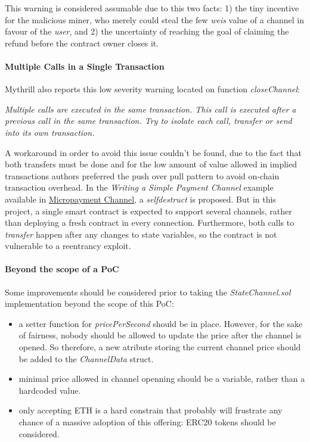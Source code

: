 \documentclass[12pt]{amsart}
\begin{document}
\begin{multicols}{2}
\vspace{0.35cm}

This warning is considered assumable due to this two facts: 1) the tiny incentive for the
malicious miner, who merely could steal the few \textit{weis} value of a channel in favour
of the \textit{user}, and 2) the uncertainty of reaching the goal of claiming the refund
before the contract owner closes it.

\vspace{0.35cm}

\paragraph{Multiple Calls in a Single Transaction}

Mythrill also reports this low severity warning located on function \textit{closeChannel}:

\textit{Multiple calls are executed in the same
transaction. This call is executed after a previous call in the same transaction.
Try to isolate each call, transfer or send into its own transaction.}

\vspace{0.35cm}

A workaround in order to avoid this issue couldn't be found, due to the fact that both
transfers must be done and for the low amount of value
allowed in implied transactions authors preferred
the push over pull pattern to avoid on-chain transaction overhead.
In the \textit{Writing a Simple Payment Channel} example available in
\href{https://solidity.readthedocs.io/en/latest/solidity-by-example.html#micropayment-channel}{Micropayment Channel},
a \textit{selfdestruct} is proposed. But in this project, a single smart contract is expected
to support several channels, rather than deploying a fresh contract in every connection.
Furthermore, both calls to \textit{transfer} happen after any changes to state variables,
so the contract is not vulnerable to a reentrancy exploit.

\paragraph{Beyond the scope of a PoC}

Some improvements should be considered prior to taking the \textit{StateChannel.sol}
implementation beyond the scope of this PoC:
\begin{itemize}
\item a setter function for \textit{pricePerSecond} should be in place. However, for the sake of
fairness, nobody should be allowed to update the price after the channel is opened. So therefore,
a new atribute storing the current channel price should be added to the \textit{ChannelData} struct.
\item minimal price allowed in channel openning should be a variable, rather than a hardcoded value.
\item only accepting ETH is a hard constrain that probably will frustrate any chance of a massive
adoption of this offering: ERC20 tokens should be considered.
\end{itemize}


\end{multicols}
\end{document}
